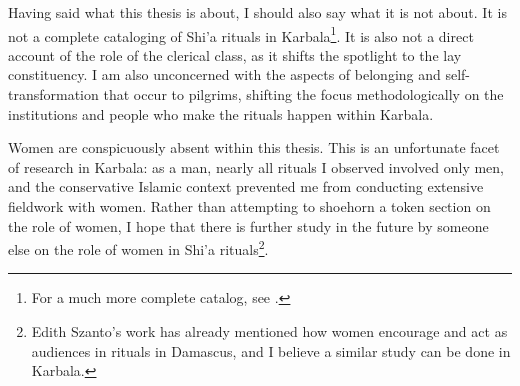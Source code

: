 
Having said what this thesis is about, I should also say what it is not about. It is not a complete cataloging of Shi'a rituals in Karbala\footnote{For a much more complete catalog, see \cite{hamdan_development_2012}.}. It is also not a direct account of the role of the clerical class, as it shifts the spotlight to the lay constituency. I am also unconcerned with the aspects of belonging and self-transformation that occur to pilgrims, shifting the focus methodologically on the institutions and people who make the rituals happen within Karbala.

Women are conspicuously absent within this thesis. This is an unfortunate facet of research in Karbala: as a man, nearly all rituals I observed involved only men, and the conservative Islamic context prevented me from conducting extensive fieldwork with women. Rather than attempting to shoehorn a token section on the role of women, I hope that there is further study in the future by someone else on the role of women in Shi'a rituals\footnote{Edith Szanto's work\cite{szanto_beyond_2013} has already mentioned how women encourage and act as audiences in rituals in Damascus, and I believe a similar study can be done in Karbala.}. 




